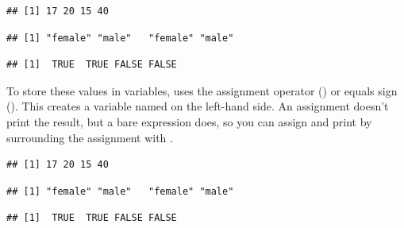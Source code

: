 \documentclass[11pt]{book}
\renewenvironment{knitrout}{\small\renewcommand{\baselinestretch}{.85}}{} %
\begin{document}
\begin{knitrout}
\color{fgcolor}\begin{kframe}
\begin{alltt}
\hlstd{(}\hlstd{,} \hlstd{,} \hlstd{,} \hlstd{)}
\end{alltt}
\begin{verbatim}
## [1] 17 20 15 40
\end{verbatim}
\begin{alltt}
\hlstd{(}\hlstd{,} \hlstd{,} \hlstd{,} \hlstd{)}
\end{alltt}
\begin{verbatim}
## [1] "female" "male"   "female" "male"
\end{verbatim}
\begin{alltt}
\hlstd{(}\hlstd{,} \hlstd{,} \hlstd{,} \hlstd{)}
\end{alltt}
\begin{verbatim}
## [1]  TRUE  TRUE FALSE FALSE
\end{verbatim}
\end{kframe}
\end{knitrout}

To store these values in variables, \R uses the assignment operator (\code{<-})
or equals sign (\code{=}). This creates a variable named on the left-hand side.
An assignment doesn't print the result, but a bare expression does, so you can
assign and print by surrounding the assignment with \code{()}.

\begin{knitrout}
\color{fgcolor}\begin{kframe}
\begin{alltt}
 \hlkwb{<-} \hlstd{(}\hlstd{,} \hlstd{,} \hlstd{,} \hlstd{)}                       
                                            
\end{alltt}
\begin{verbatim}
## [1] 17 20 15 40
\end{verbatim}
\begin{alltt}
 \hlkwb{<-} \hlstd{(}\hlstd{,} \hlstd{,} \hlstd{,} \hlstd{))}   
\end{alltt}
\begin{verbatim}
## [1] "female" "male"   "female" "male"
\end{verbatim}
\begin{alltt}
 \hlkwb{<-} \hlstd{(}\hlstd{,} \hlstd{,} \hlstd{,} \hlstd{))}
\end{alltt}
\begin{verbatim}
## [1]  TRUE  TRUE FALSE FALSE
\end{verbatim}
\end{kframe}
\end{knitrout}
\end{document}
